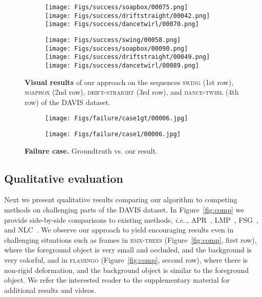 \documentclass[runningheads]{llncs}
\makeatletter
\newlength\figwidth
\newcommand\para[1]{\noindent{#1}}
\def\@onedot{\ifx\@let@token.\else.\null\fi\xspace}
\DeclareRobustCommand\onedot{\futurelet\@let@token\@onedot}
\newcommand{\figref}[1]{Figure~\ref{#1}}
\def\ie{\emph{i.e}\onedot} \def\Ie{\emph{I.e}\onedot}
\newcommand{\tb}[1]{\textbf{#1}}
\makeatother
\begin{document}
\begin{figure*}
\begin{center}
\begin{subfigure}[b]{\figwidth}
			\texttt{[image: Figs/success/soapbox/00075.png]} \\
			\texttt{[image: Figs/success/driftstraight/00042.png]} \\
			\texttt{[image: Figs/success/dancetwirl/00070.png]} \\
\end{subfigure}\hfill
		\begin{subfigure}[b]{\figwidth}
			\texttt{[image: Figs/success/swing/00058.png]} \\
			\texttt{[image: Figs/success/soapbox/00090.png]} \\
			\texttt{[image: Figs/success/driftstraight/00049.png]} \\
			\texttt{[image: Figs/success/dancetwirl/00089.png]} \\
\end{subfigure}
\caption{\tb{Visual results} of our approach on the sequences \textsc{swing} (1st row), \textsc{soapbox} (2nd row), \textsc{drift-straight} (3rd row), and \textsc{dance-twirl} (4th row) of the DAVIS dataset.	}
		\label{fig:success}
	\end{center}
\end{figure*}
 

\begin{figure}[t]
\begin{center}
		\begin{subfigure}[b]{1.48\figwidth}\texttt{[image: Figs/failure/case1gt/00006.jpg]}
		\end{subfigure}
		\begin{subfigure}[b]{1.48\figwidth}\texttt{[image: Figs/failure/case1/00006.jpg]}
		\end{subfigure}\hfill
	\end{center}
\caption{\tb{Failure case.} Groundtruth vs. our result. }
	\label{fig:fail}
\end{figure} 

\subsection{Qualitative evaluation}
\para{\bf Side-by-side comparison:} Next we present qualitative results comparing our algorithm to competing methods on challenging parts of the DAVIS dataset. In \figref{fig:comp} we provide side-by-side comparisons to existing methods, \ie, 
APR~\cite{KohCVPR17}, LMP~\cite{TokmakovCVPR2017}, FSG~\cite{jain2017fusionseg}, and NLC~\cite{FaktorBMVC14}. We observe our approach to yield encouraging results even in challenging situations such as  frames in \textsc{bmx-trees} (\figref{fig:comp}, first row), where the foreground object is very small and occluded, and the background is very colorful, and in \textsc{flamingo} (\figref{fig:comp}, second row), where there is non-rigid deformation, and the background object is similar to the foreground object.
We refer the interested reader to the supplementary material for additional results and videos. 
\end{document}
